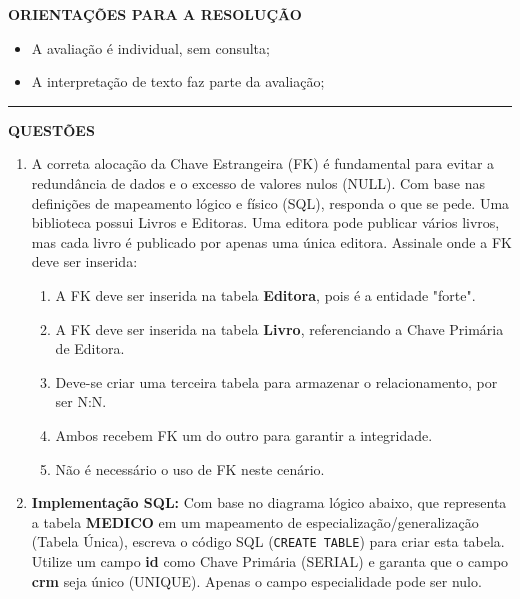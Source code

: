 \documentclass[12pt,a4paper]{article}
\begin{document}
\textbf{ORIENTAÇÕES PARA A RESOLUÇÃO}  

\begin{itemize}
    \item A avaliação é individual, sem consulta;
    \item A interpretação de texto faz parte da avaliação;
\end{itemize}

\vspace{0.5cm}

\begin{center}
    \rule{\textwidth}{0.4pt}
    \textbf{QUESTÕES}
\end{center}

\vspace{0.5cm} 

\begin{enumerate}
    \item A correta alocação da Chave Estrangeira (FK) é fundamental para evitar a redundância de dados e o excesso de valores nulos (NULL). Com base nas definições de mapeamento lógico e físico (SQL), responda o que se pede. Uma biblioteca possui Livros e Editoras. Uma editora pode publicar vários livros, mas cada livro é publicado por apenas uma única editora. Assinale onde a FK deve ser inserida:
    \begin{enumerate}[label=\Alph*)]
        \item A FK deve ser inserida na tabela \textbf{Editora}, pois é a entidade "forte".
        \item A FK deve ser inserida na tabela \textbf{Livro}, referenciando a Chave Primária de Editora.
        \item Deve-se criar uma terceira tabela para armazenar o relacionamento, por ser N:N.
        \item Ambos recebem FK um do outro para garantir a integridade.
        \item Não é necessário o uso de FK neste cenário.
    \end{enumerate}

    \item \textbf{Implementação SQL:} Com base no diagrama lógico abaixo, que representa a tabela \textbf{MEDICO} em um mapeamento de especialização/generalização (Tabela Única), escreva o código SQL (\texttt{CREATE TABLE}) para criar esta tabela. Utilize um campo \textbf{id} como Chave Primária (SERIAL) e garanta que o campo \textbf{crm} seja único (UNIQUE). Apenas o campo especialidade pode ser nulo.


\end{enumerate}
\end{document}
